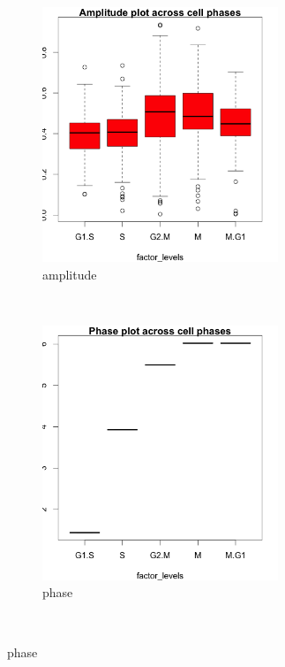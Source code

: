 \documentclass[11pt]{article}
\begin{document}
 
  \begin{figure}[ht]
    \centering    
     \begin{subfigure}[t]{0.5\textwidth}
        \centering
        \includegraphics[height=3in]{../figures/cell_order_R_figs/amplitude_plot_phase_fixed.png}
        \caption{amplitude}
    \end{subfigure}%
    ~
    \begin{subfigure}[t]{0.5\textwidth}
        \centering
        \includegraphics[height=3in]{../figures/cell_order_R_figs/phase_plot_phase_fixed.png}
        \caption{phase}
    \end{subfigure}\\
    

\end{figure}
\end{document}
